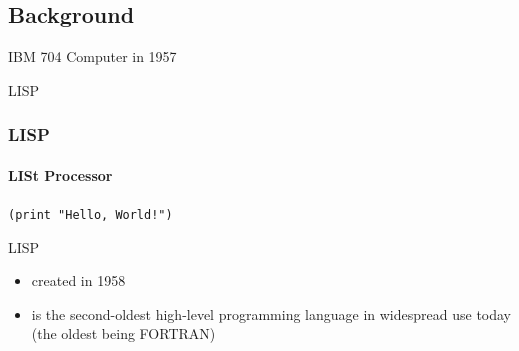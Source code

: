 \documentclass[aspectratio=169,dvipsnames]{beamer}
\begin{document}
    \subsection{Background}
\begin{frame}[plain]
\hfill        {\small\color{white}IBM 704 Computer in 1957}
\vfill\vfill\vfill\vfill\vfill
\begin{minipage}[c]{0.5\textwidth}
        \pause
        \begin{center}
        \vspace*{2ex}
        \Huge LISP
        \vspace*{1ex}
        \end{center}
        \endoldBlock
\end{minipage}\hfill


\end{frame}
    \begin{frame}
        \frametitle{LISP}
        \framesubtitle{LISt Processor}
            \begin{center}\texttt{(print "Hello, World!")}\end{center}
        \begin{block}{LISP}
            \begin{itemize}
                \item created in 1958
                \item is the second-oldest high-level programming language in widespread use today (the oldest being FORTRAN)
            \end{itemize}
        \end{block}

    \end{frame}
\end{document}
